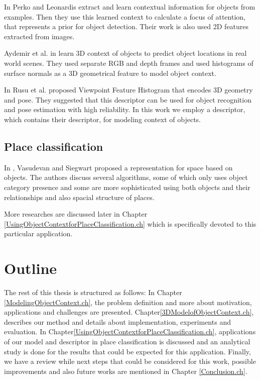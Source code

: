      In \cite{PerkoLeonardisContextDriven} Perko and Leonardis extract and learn contextual information for objects from examples.
     Then they use this learned context to calculate a focus of attention, that represents a prior for object detection. Their work is 
     also used 2D features extracted from images. 
 
      Aydemir et al. in \cite{aydemir2012_3Dcontext} learn 3D context of objects to predict object locations in 
      real world scenes. 
      They used separate RGB and depth frames and used histograms of surface normals as a 3D geometrical feature
      to model object context.
      
    In \cite{5651280} Rusu et al. proposed Viewpoint Feature Histogram that encodes 3D geometry and pose. They suggested that this descriptor
    can be used for object recognition and pose estimation with high reliability.
    In this work we employ a descriptor, which contains their descriptor, for modeling context of objects.
     
\subsection*{Place classification}

    In \cite{Vasudevan2008522}, Vasudevan and Siegwart proposed a representation for space based on objects. 
    The authors discuss several algorithms, some of which only uses object category presence and some are more sophisticated using both 
    objects and their relationships and also spacial structure of places.
    
    More researches are discussed later in Chapter \ref{UsingObjectContextforPlaceClassification.ch} which is 
    specifically devoted to this particular application.
     
\section {Outline}
\label{Outline.sec}
The rest of this thesis is structured as follows:
In Chapter \ref{ModelingObjectContext.ch}, the problem definition and more about motivation, applications and 
challenges are presented.
Chapter\ref{3DModelofObjectContext.ch}, describes our method and details about implementation, experiments and evaluation. 
In Chapter\ref{UsingObjectContextforPlaceClassification.ch}, applications of our model and descriptor in place classification is 
discussed and an analytical study is done for the results that could be expected for this application.
Finally, we have a review while next steps that could be considered for this work, possible improvements 
and also future works are mentioned in Chapter \ref{Conclusion.ch}.

